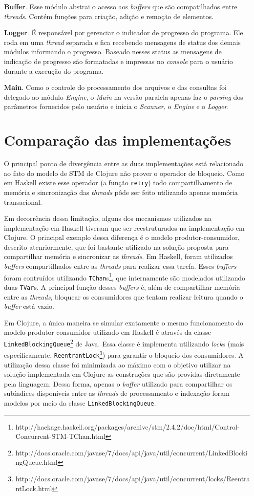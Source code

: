 \textbf{Buffer}. Esse módulo abstrai o acesso aos \emph{buffers} que são compatilhados entre \emph{threads}. Contém funções para criação, adição e remoção de elementos.

\textbf{Logger}. É responsável por gerenciar o indicador de progresso do programa. Ele roda em uma \emph{thread} separada e fica recebendo mensagens de status dos demais módulos informando o progresso. Baseado nesses status as mensagens de indicação de progresso são formatadas e impressas no \emph{console} para o usuário durante a execução do programa.

\textbf{Main}. Como o controle do processamento dos arquivos e das consultas foi delegado ao módulo \emph{Engine}, o \emph{Main} na versão paralela apenas faz o \emph{parsing} dos parâmetros fornecidos pelo usuário e inicia o \emph{Scanner}, o \emph{Engine} e o \emph{Logger}.


\section{Comparação das implementações}

O principal ponto de divergência entre as duas implementações está relacionado ao fato do modelo de STM de Clojure não prover o operador de bloqueio. Como em Haskell existe esse operador (a função \verb|retry|) todo compartilhamento de memória e sincronização das \emph{threads} pôde ser feito utilizando apenas memória transacional.

Em decorrência dessa limitação, alguns dos mecanismos utilizados na implementação em Haskell tiveram que ser reestruturados na implementação em Clojure. O principal exemplo dessa diferença é o modelo produtor-consumidor, descrito atenriormente, que foi bastante utilizado na solução proposta para compartilhar memória e sincronizar as \emph{threads}. Em Haskell, foram utilizados \emph{buffers} compartilhados entre as \emph{threads} para realizar essa tarefa. Esses \emph{buffers} foram contruídos utilizando \verb|TChan|s\footnote{http://hackage.haskell.org/packages/archive/stm/2.4.2/doc/html/Control-Concurrent-STM-TChan.html}, que internamente são modelados utilizando duas \verb|TVar|s. A principal função desses \emph{buffers} é, além de compartilhar memória entre as \emph{threads}, bloquear os consumidores que tentam realizar leitura quando o \emph{buffer} está vazio.

Em Clojure, a única maneira se simular exatamente o mesmo funcionamento do modelo produtor-consumidor utilizado em Haskell é através da classe \verb|LinkedBlockingQueue|\footnote{http://docs.oracle.com/javase/7/docs/api/java/util/concurrent/LinkedBlockingQueue.html} de Java. Essa classe é implementa utilizando \emph{locks} (mais especificamente, \verb|ReentrantLock|\footnote{http://docs.oracle.com/javase/7/docs/api/java/util/concurrent/locks/ReentrantLock.html}) para garantir o bloqueio dos consumidores. A utilização dessa classe foi minimizada ao máximo com o objetivo utilizar na solução implementada em Clojure as construções que são providas diretamente pela linguagem. Dessa forma, apenas o \emph{buffer} utilizado para compartilhar os subíndices disponíveis entre as \emph{threads} de processamento e indexação foram modelos por meio da classe \verb|LinkedBlockingQueue|.

